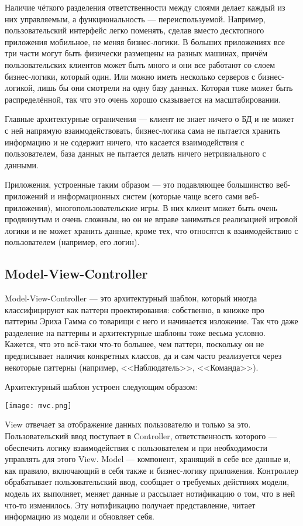 \documentclass{../../text-style}
\begin{document}
Наличие чёткого разделения ответственности между слоями делает каждый из них управляемым, а функциональность --- переиспользуемой. Например, пользовательский интерфейс легко поменять, сделав вместо десктопного приложения мобильное, не меняя бизнес-логики. В больших приложениях все три части могут быть физически размещены на разных машинах, причём пользовательских клиентов может быть много и они все работают со слоем бизнес-логики, который один. Или можно иметь несколько серверов с бизнес-логикой, лишь бы они смотрели на одну базу данных. Которая тоже может быть распределённой, так что это очень хорошо сказывается на масштабировании. 

Главные архитектурные ограничения --- клиент не знает ничего о БД и не может с ней напрямую взаимодействовать, бизнес-логика сама не пытается хранить информацию и не содержит ничего, что касается взаимодействия с пользователем, база данных не пытается делать ничего нетривиального с данными. 

Приложения, устроенные таким образом --- это подавляющее большинство веб-приложений и информационных систем (которые чаще всего сами веб-приложения), многопользовательские игры. В них клиент может быть очень продвинутым и очень сложным, но он не вправе заниматься реализацией игровой логики и не может хранить данные, кроме тех, что относятся к взаимодействию с пользователем (например, его логин).

\subsection{Model-View-Controller}

Model-View-Controller --- это архитектурный шаблон, который иногда классифицируют как паттерн проектирования: собственно, в книжке про паттерны Эриха Гамма со товарищи с него и начинается изложение. Так что даже разделение на паттерны и архитектурные шаблоны тоже весьма условно. Кажется, что это всё-таки что-то большее, чем паттерн, поскольку он не предписывает наличия конкретных классов, да и сам часто реализуется через некоторые паттерны (например, <<Наблюдатель>>, <<Команда>>).

Архитектурный шаблон устроен следующим образом:

\begin{center}
    \texttt{[image: mvc.png]}
\end{center}

View отвечает за отображение данных пользователю и только за это. Пользовательский ввод поступает в Controller, ответственность которого --- обеспечить логику взаимодействия с пользователем и при необходимости управлять для этого View. Model --- компонент, хранящий в себе все данные и, как правило, включающий в себя также и бизнес-логику приложения. Контроллер обрабатывает пользовательский ввод, сообщает о требуемых действиях модели, модель их выполняет, меняет данные и рассылает нотификацию о том, что в ней что-то изменилось. Эту нотификацию получает представление, читает информацию из модели и обновляет себя.
\end{document}
